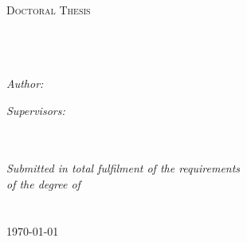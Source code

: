 \documentclass[11pt, oneside]{Thesis} %
\begin{document}
\begin{titlepage}
\begin{center}

\textsc{\LARGE \univname}\\[1.5cm] %
\textsc{\Large Doctoral Thesis}\\[0.5cm] %

\HRule \\[0.4cm]
{\huge \bfseries \ttitle}\\[0.4cm] %
\HRule \\[1.5cm]
 
\begin{minipage}{0.4\textwidth}
\begin{flushleft} \large
\emph{Author:}\\
\href{http://www.ms.unimelb.edu.au/Personnel/profile.php?PC_id=1763}{\authornames} %
\end{flushleft}
\end{minipage}
\begin{minipage}{0.4\textwidth}
\begin{flushright} \large
\emph{Supervisors:} \\%
\href{http://www.ms.unimelb.edu.au/Personnel/profile.php?PC_id=147}{\supnameone} \\ 
\href{http://www.ms.unimelb.edu.au/~aurored/}{\supnametwo}
\end{flushright}
\end{minipage}\\[3cm]
 
\large \textit{Submitted in total fulfilment of the requirements\\ of the degree of \degreename}\\[0.3cm] %
\groupname\\\deptname\\[2cm] %
 
{\large \today}\\[4cm] %
 
\vfill
\end{center}
\end{titlepage}

\end{document}
